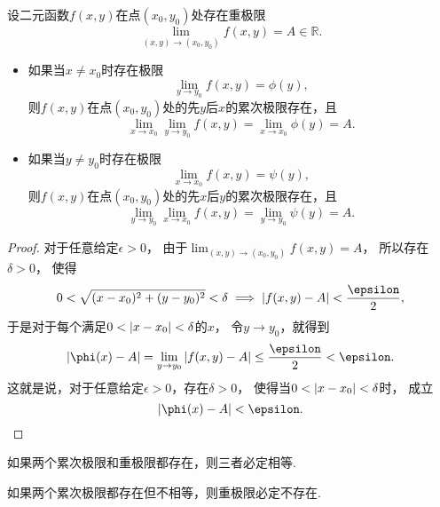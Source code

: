 \begin{theorem}
设二元函数\(f(x,y)\)在点\((x_0,y_0)\)处存在重极限\[
	\lim_{(x,y)\to(x_0,y_0)} f(x,y) = A \in \mathbb{R}.
\]\begin{itemize}
	\item 如果当\(x \neq x_0\)时存在极限\[
		\lim_{y \to y_0} f(x,y) = \phi(y),
	\]
	则\(f(x,y)\)在点\((x_0,y_0)\)处的先\(y\)后\(x\)的累次极限存在，且\[
		\lim_{x \to x_0} \lim_{y \to y_0} f(x,y)
		= \lim_{x \to x_0} \phi(y) = A.
	\]

	\item 如果当\(y \neq y_0\)时存在极限\[
		\lim_{x \to x_0} f(x,y) = \psi(y),
	\]
	则\(f(x,y)\)在点\((x_0,y_0)\)处的先\(x\)后\(y\)的累次极限存在，且\[
		\lim_{y \to y_0} \lim_{x \to x_0} f(x,y)
		= \lim_{y \to y_0} \psi(y) = A.
	\]
\end{itemize}
\begin{proof}
对于任意给定\(\epsilon>0\)，
由于\(\lim_{(x,y)\to(x_0,y_0)} f(x,y) = A\)，
所以存在\(\delta>0\)，
使得\[
	0<\sqrt{(x-x_0)^2+(y-y_0)^2}<\delta
	\implies
	\abs{f(x,y)-A}<\frac\epsilon2,
\]
于是对于每个满足\(0<\abs{x-x_0}<\delta\)的\(x\)，
令\(y \to y_0\)，就得到\[
	\abs{\phi(x)-A}
	= \lim_{y \to y_0} \abs{f(x,y)-A}
	\leq \frac\epsilon2
	< \epsilon.
\]
这就是说，对于任意给定\(\epsilon>0\)，存在\(\delta>0\)，
使得当\(0<\abs{x-x_0}<\delta\)时，
成立\[
	\abs{\phi(x)-A} < \epsilon.
	\qedhere
\]
\end{proof}
\end{theorem}

\begin{corollary}
如果两个累次极限和重极限都存在，则三者必定相等.
\end{corollary}

\begin{corollary}
如果两个累次极限都存在但不相等，则重极限必定不存在.
\end{corollary}

